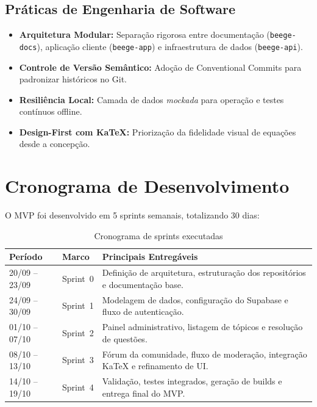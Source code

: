 \documentclass[12pt, a4paper]{article}
\begin{document}
\subsection{Pr\'{a}ticas de Engenharia de Software}

\begin{itemize}[leftmargin=2cm]
  \item \textbf{Arquitetura Modular:} Separa\c{c}\~{a}o rigorosa entre documenta\c{c}\~{a}o (\texttt{beege-docs}), aplica\c{c}\~{a}o cliente (\texttt{beege-app}) e infraestrutura de dados (\texttt{beege-api}).
  \item \textbf{Controle de Vers\~{a}o Sem\^{a}ntico:} Ado\c{c}\~{a}o de Conventional Commits para padronizar hist\'{o}ricos no Git.
  \item \textbf{Resili\^{e}ncia Local:} Camada de dados \textit{mockada} para opera\c{c}\~{a}o e testes cont\'{i}nuos offline.
  \item \textbf{Design-First com KaTeX:} Prioriza\c{c}\~{a}o da fidelidade visual de equa\c{c}\~{o}es desde a concep\c{c}\~{a}o.
\end{itemize}

\section{Cronograma de Desenvolvimento}

O MVP foi desenvolvido em 5 sprints semanais, totalizando 30 dias:

\begin{table}[H]
\centering
\caption{Cronograma de sprints executadas}
\begin{tabularx}{\textwidth}{l l X}
\toprule
\textbf{Per\'{i}odo} & \textbf{Marco} & \textbf{Principais Entreg\'{a}veis} \\
\midrule
20/09 -- 23/09 & Sprint~0 & Defini\c{c}\~{a}o de arquitetura, estrutura\c{c}\~{a}o dos reposit\'{o}rios e documenta\c{c}\~{a}o base. \\
24/09 -- 30/09 & Sprint~1 & Modelagem de dados, configura\c{c}\~{a}o do Supabase e fluxo de autentica\c{c}\~{a}o. \\
01/10 -- 07/10 & Sprint~2 & Painel administrativo, listagem de t\'{o}picos e resolu\c{c}\~{a}o de quest\~{o}es. \\
08/10 -- 13/10 & Sprint~3 & F\'{o}rum da comunidade, fluxo de modera\c{c}\~{a}o, integra\c{c}\~{a}o KaTeX e refinamento de UI. \\
14/10 -- 19/10 & Sprint~4 & Valida\c{c}\~{a}o, testes integrados, gera\c{c}\~{a}o de builds e entrega final do MVP. \\
\bottomrule
\end{tabularx}
\end{table}
\end{document}
